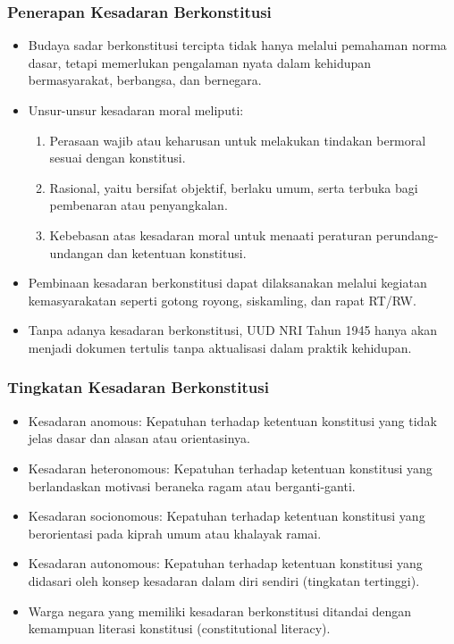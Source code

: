 \subsubsection{Penerapan Kesadaran Berkonstitusi}
\begin{itemize}
\item Budaya sadar berkonstitusi tercipta tidak hanya melalui pemahaman norma dasar, tetapi memerlukan pengalaman nyata dalam kehidupan bermasyarakat, berbangsa, dan bernegara.
\item Unsur-unsur kesadaran moral meliputi:
  \begin{enumerate}
  \item Perasaan wajib atau keharusan untuk melakukan tindakan bermoral sesuai dengan konstitusi.
  \item Rasional, yaitu bersifat objektif, berlaku umum, serta terbuka bagi pembenaran atau penyangkalan.
  \item Kebebasan atas kesadaran moral untuk menaati peraturan perundang-undangan dan ketentuan konstitusi.
  \end{enumerate}
\item Pembinaan kesadaran berkonstitusi dapat dilaksanakan melalui kegiatan kemasyarakatan seperti gotong royong, siskamling, dan rapat RT/RW.
\item Tanpa adanya kesadaran berkonstitusi, UUD NRI Tahun 1945 hanya akan menjadi dokumen tertulis tanpa aktualisasi dalam praktik kehidupan.
\end{itemize}

\subsubsection{Tingkatan Kesadaran Berkonstitusi}
\begin{itemize}
\item Kesadaran anomous: Kepatuhan terhadap ketentuan konstitusi yang tidak jelas dasar dan alasan atau orientasinya.
\item Kesadaran heteronomous: Kepatuhan terhadap ketentuan konstitusi yang berlandaskan motivasi beraneka ragam atau berganti-ganti.
\item Kesadaran socionomous: Kepatuhan terhadap ketentuan konstitusi yang berorientasi pada kiprah umum atau khalayak ramai.
\item Kesadaran autonomous: Kepatuhan terhadap ketentuan konstitusi yang didasari oleh konsep kesadaran dalam diri sendiri (tingkatan tertinggi).
\item Warga negara yang memiliki kesadaran berkonstitusi ditandai dengan kemampuan literasi konstitusi (constitutional literacy).
\end{itemize}


